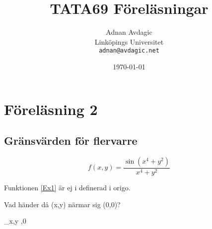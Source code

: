 \documentclass{article}
\begin{document}
\title{TATA69 Föreläsningar}
\author{Adnan Avdagic\\
	Linköpings Universitet\\
	\texttt{adnan@avdagic.net}}
\date{\today}
\maketitle

\newpage


\section{Föreläsning 2}
\subsection{Gränsvärden för flervarre}

\begin{equation} \label{Ex1}
	f(x,y) = \frac{\sin(x^4+y^2)}{x^4+y^2}
\end{equation}

Funktionen \ref{Ex1} är ej i definerad i origo.


Vad händer då (x,y) närmar sig (0,0)?

\lim_{x,y ,0} 
\end{document}
